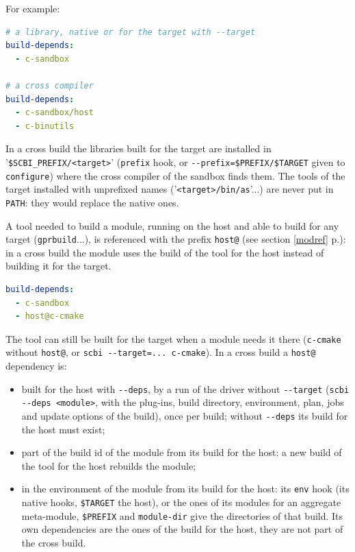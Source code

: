 \documentclass[a4paper,12pt,twoside]{article}
\newcommand{\code}[1]{\texttt{#1}}
\newcommand{\seeref}[1]{see section \ref{#1} p.\pageref{#1}}
\newcommand{\file}[1]{'{\texttt{#1}}'}
\newcommand{\ddash}{-{}-}
\begin{document}
For example:

\begin{lstlisting}[language={yaml}]
# a library, native or for the target with --target
build-depends:
  - c-sandbox

# a cross compiler
build-depends:
  - c-sandbox/host
  - c-binutils
\end{lstlisting}

In a cross build the libraries built for the target are installed in
\file{\$SCBI\_PREFIX/<target>} (\code{prefix} hook, or
\code{\ddash{}prefix=\$PREFIX/\$TARGET} given to \code{configure}) where the
cross compiler of the sandbox finds them. The tools of the target
installed with unprefixed names (\file{<target>/bin/as}...) are never put
in \code{PATH}: they would replace the native ones.

\label{host-deps}
A tool needed to build a module, running on the host and able to build for
any target (\code{gprbuild}...), is referenced with the prefix
\code{host@} (\seeref{modref}): in a cross build the module uses the build
of the tool for the host instead of building it for the target.

\begin{lstlisting}[language={yaml}]
build-depends:
  - c-sandbox
  - host@c-cmake
\end{lstlisting}

The tool can still be built for the target when a module needs it there
(\code{c-cmake} without \code{host@}, or \code{scbi \ddash{}target=...
c-cmake}). In a cross build a \code{host@} dependency is:

\begin{itemize}
	\item built for the host with \code{\ddash{}deps}, by a run of the driver
	without \code{\ddash{}target} (\code{scbi \ddash{}deps <module>}, with the
	plug-ins, build directory, environment, plan, jobs and update options
	of the build), once per build; without \code{\ddash{}deps} its build for the
	host must exist;
	\item part of the build id of the module from its build for the host:
	a new build of the tool for the host rebuilds the module;
	\item in the environment of the module from its build for the host:
	its \code{env} hook (its native hooks, \code{\$TARGET} the host), or
	the ones of its modules for an aggregate meta-module,
	\code{\$PREFIX} and \code{module-dir} give the directories of that
	build. Its own dependencies are the ones of the build for the host,
	they are not part of the cross build.
\end{itemize}
\end{document}
